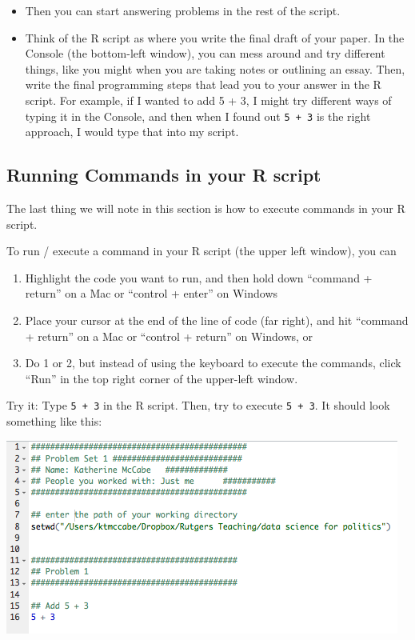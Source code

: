 \documentclass[
  letterpaper,
  DIV=11,
  numbers=noendperiod]{scrreprt}
\providecommand{\tightlist}{%
  \setlength{\itemsep}{0pt}\setlength{\parskip}{0pt}}\usepackage{longtable,booktabs,array}
\begin{document}
\begin{itemize}
\tightlist
\item
  Then you can start answering problems in the rest of the script.
\item
  Think of the R script as where you write the final draft of your
  paper. In the Console (the bottom-left window), you can mess around
  and try different things, like you might when you are taking notes or
  outlining an essay. Then, write the final programming steps that lead
  you to your answer in the R script. For example, if I wanted to add 5
  + 3, I might try different ways of typing it in the Console, and then
  when I found out \texttt{5\ +\ 3} is the right approach, I would type
  that into my script.
\end{itemize}

\hypertarget{running-commands-in-your-r-script}{%
\subsection{Running Commands in your R
script}\label{running-commands-in-your-r-script}}

The last thing we will note in this section is how to execute commands
in your R script.

To run / execute a command in your R script (the upper left window), you
can

\begin{enumerate}
\def\labelenumi{\arabic{enumi}.}
\tightlist
\item
  Highlight the code you want to run, and then hold down ``command +
  return'' on a Mac or ``control + enter'' on Windows
\item
  Place your cursor at the end of the line of code (far right), and hit
  ``command + return'' on a Mac or ``control + return'' on Windows, or
\item
  Do 1 or 2, but instead of using the keyboard to execute the commands,
  click ``Run'' in the top right corner of the upper-left window.
\end{enumerate}

Try it: Type \texttt{5\ +\ 3} in the R script. Then, try to execute
\texttt{5\ +\ 3}. It should look something like this:

\includegraphics{images/rtemplate2.png}
\end{document}
